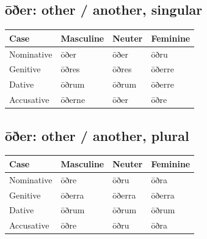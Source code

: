 \subsection*{ōðer: other /\allowbreak{} another, singular}

\par\begingroup
\fontsize{10.5}{13.2}\selectfont
\setlength{\LTleft}{0pt}\setlength{\LTright}{\fill}
\noindent
\begin{tabular}{@{}>{\raggedright\arraybackslash}p{28.89mm}>{\raggedright\arraybackslash}p{28.89mm}>{\raggedright\arraybackslash}p{28.89mm}>{\raggedright\arraybackslash}p{28.89mm}@{}}
\toprule
\textbf{Case} & \textbf{Masculine} & \textbf{Neuter} & \textbf{Feminine} \\
\midrule
Nominative & ōðer & ōðer & ōðru \\
Genitive & ōðres & ōðres & ōðerre \\
Dative & ōðrum & ōðrum & ōðerre \\
Accusative & ōðerne & ōðer & ōðre \\
\bottomrule
\end{tabular}
\par\endgroup

\subsection*{ōðer: other /\allowbreak{} another, plural}

\par\begingroup
\fontsize{10.5}{13.2}\selectfont
\setlength{\LTleft}{0pt}\setlength{\LTright}{\fill}
\noindent
\begin{tabular}{@{}>{\raggedright\arraybackslash}p{28.89mm}>{\raggedright\arraybackslash}p{28.89mm}>{\raggedright\arraybackslash}p{28.89mm}>{\raggedright\arraybackslash}p{28.89mm}@{}}
\toprule
\textbf{Case} & \textbf{Masculine} & \textbf{Neuter} & \textbf{Feminine} \\
\midrule
Nominative & ōðre & ōðru & ōðra \\
Genitive & ōðerra & ōðerra & ōðerra \\
Dative & ōðrum & ōðrum & ōðrum \\
Accusative & ōðre & ōðru & ōðra \\
\bottomrule
\end{tabular}
\par\endgroup

